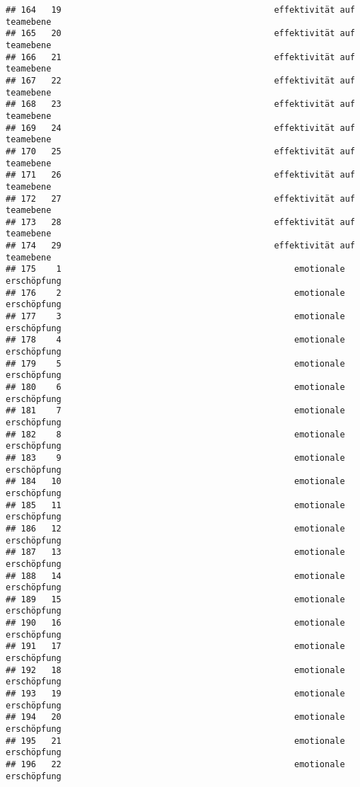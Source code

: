 \documentclass[
]{article}
\begin{document}
\begin{verbatim}
## 164   19                                          effektivität auf teamebene
## 165   20                                          effektivität auf teamebene
## 166   21                                          effektivität auf teamebene
## 167   22                                          effektivität auf teamebene
## 168   23                                          effektivität auf teamebene
## 169   24                                          effektivität auf teamebene
## 170   25                                          effektivität auf teamebene
## 171   26                                          effektivität auf teamebene
## 172   27                                          effektivität auf teamebene
## 173   28                                          effektivität auf teamebene
## 174   29                                          effektivität auf teamebene
## 175    1                                              emotionale erschöpfung
## 176    2                                              emotionale erschöpfung
## 177    3                                              emotionale erschöpfung
## 178    4                                              emotionale erschöpfung
## 179    5                                              emotionale erschöpfung
## 180    6                                              emotionale erschöpfung
## 181    7                                              emotionale erschöpfung
## 182    8                                              emotionale erschöpfung
## 183    9                                              emotionale erschöpfung
## 184   10                                              emotionale erschöpfung
## 185   11                                              emotionale erschöpfung
## 186   12                                              emotionale erschöpfung
## 187   13                                              emotionale erschöpfung
## 188   14                                              emotionale erschöpfung
## 189   15                                              emotionale erschöpfung
## 190   16                                              emotionale erschöpfung
## 191   17                                              emotionale erschöpfung
## 192   18                                              emotionale erschöpfung
## 193   19                                              emotionale erschöpfung
## 194   20                                              emotionale erschöpfung
## 195   21                                              emotionale erschöpfung
## 196   22                                              emotionale erschöpfung

\end{verbatim}
\end{document}
